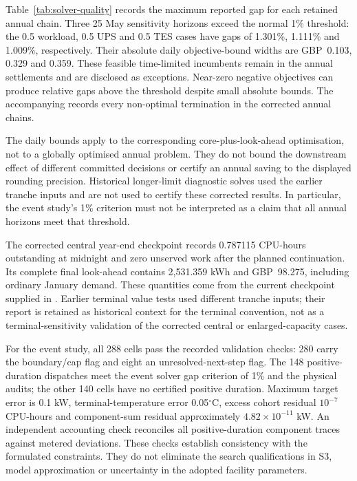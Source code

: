 

Table~\ref{tab:solver-quality} records the maximum reported gap for each retained annual chain. Three 25 May sensitivity horizons exceed the normal 1\% threshold: the 0.5 workload, 0.5 UPS and 0.5 TES cases have gaps of 1.301\%, 1.111\% and 1.009\%, respectively. Their absolute daily objective-bound widths are GBP~0.103, 0.329 and 0.359. These feasible time-limited incumbents remain in the annual settlements and are disclosed as exceptions. Near-zero negative objectives can produce relative gaps above the threshold despite small absolute bounds. The accompanying  records every non-optimal termination in the corrected annual chains.

The daily bounds apply to the corresponding core-plus-look-ahead optimisation, not to a globally optimised annual problem. They do not bound the downstream effect of different committed decisions or certify an annual saving to the displayed rounding precision. Historical longer-limit diagnostic solves used the earlier tranche inputs and are not used to certify these corrected results. In particular, the event study's 1\% criterion must not be interpreted as a claim that all annual horizons meet that threshold.

The corrected central year-end checkpoint records 0.787115 CPU-hours outstanding at midnight and zero unserved work after the planned continuation. Its complete final look-ahead contains 2,531.359 kWh and GBP~98.275, including ordinary January demand. These quantities come from the current checkpoint supplied in . Earlier \textcolor{LatestGreen}{terminal value} tests used different tranche inputs; their report is retained as historical context for the terminal convention, not as a terminal-sensitivity validation of the corrected central or enlarged-capacity cases.

For the event study, all 288 cells pass the recorded validation checks: 280 carry the boundary/cap flag and eight an unresolved-next-step flag. The 148 positive-duration dispatches meet the event \textcolor{LatestGreen}{solver gap} criterion of 1\% and the physical audits; the other 140 cells have no certified positive duration. Maximum target error is 0.1 kW, terminal-temperature error 0.05$^{\circ}$C, excess cohort residual $10^{-7}$ CPU-hours and component-sum residual approximately $4.82\times10^{-11}$ kW. An independent accounting check reconciles all positive-duration component traces against metered deviations. These checks establish consistency with the formulated constraints. They do not eliminate the search qualifications in S3, model approximation or uncertainty in the adopted facility parameters.

